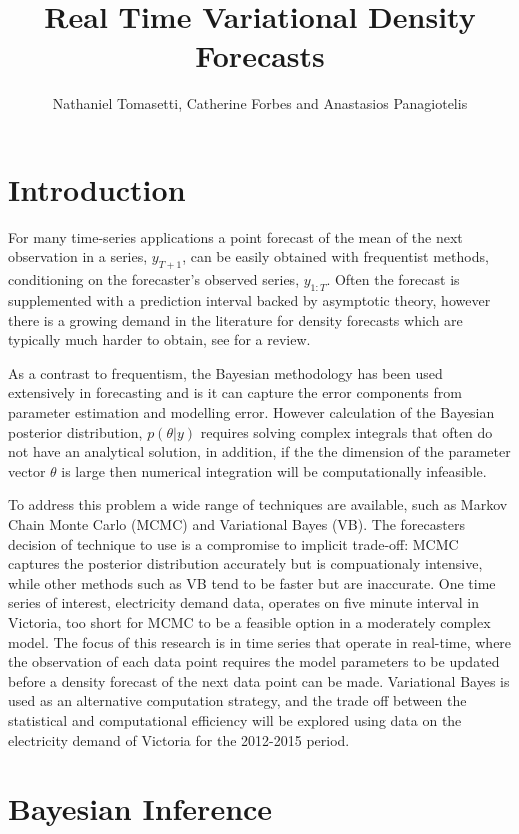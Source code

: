 \documentclass{article}\usepackage[]{graphicx}\usepackage[]{color}
\title{Real Time Variational Density Forecasts}
\author{Nathaniel Tomasetti, Catherine Forbes and Anastasios Panagiotelis}
\begin{document}
\maketitle
\tableofcontents
\section{Introduction} 

For many time-series applications a point forecast of the mean of the next observation in a series, $y_{T+1}$, can be easily obtained with frequentist methods, conditioning on the forecaster's observed series, $y_{1:T}$. Often the forecast is supplemented with a prediction interval backed by asymptotic theory, however there is a growing demand in the literature for density forecasts which are typically much harder to obtain, see \citet{Gneiting2014} for a review.

As a contrast to frequentism, the Bayesian methodology has been used extensively in forecasting \citep{Geweke2006} and is it can capture the error components from parameter estimation and modelling error. However calculation of the Bayesian posterior distribution, $p(\theta | y)$ requires solving complex integrals that often do not have an analytical solution, in addition, if the the dimension of the parameter vector $\theta$ is large then numerical integration will be computationally infeasible. 

To address this problem a wide range of techniques are available, such as Markov Chain Monte Carlo (MCMC) and Variational Bayes (VB). The forecasters decision of technique to use is a compromise to implicit trade-off: MCMC captures the posterior distribution accurately but is compuationaly intensive, while other methods such as VB tend to be faster but are inaccurate. One time series of interest, electricity demand data, operates on five minute interval in Victoria, too short for MCMC to be a feasible option in a moderately complex model. The focus of this research is in time series that operate in real-time, where the observation of each data point requires the model parameters to be updated before a density forecast of the next data point can be made. Variational Bayes is used as an alternative computation strategy, and the trade off between the statistical and computational efficiency will be explored using data on the electricity demand of Victoria for the 2012-2015 period.

\section{Bayesian Inference}
\end{document}
